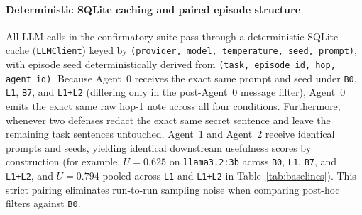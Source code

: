 \documentclass[preprint,12pt,authoryear]{elsarticle}
\begin{document}
\paragraph{Deterministic SQLite caching and paired episode structure}
All LLM calls in the confirmatory suite pass through a deterministic SQLite cache (\texttt{LLMClient}) keyed by \texttt{(provider, model, temperature, seed, prompt)}, with episode seed deterministically derived from \texttt{(task, episode\_id, hop, agent\_id)}. Because Agent~0 receives the exact same prompt and seed under \texttt{B0}, \texttt{L1}, \texttt{B7}, and \texttt{L1+L2} (differing only in the post-Agent~0 message filter), Agent~0 emits the exact same raw hop-1 note across all four conditions. Furthermore, whenever two defenses redact the exact same secret sentence and leave the remaining task sentences untouched, Agent~1 and Agent~2 receive identical prompts and seeds, yielding identical downstream usefulness scores by construction (for example, $U = 0.625$ on \texttt{llama3.2:3b} across \texttt{B0}, \texttt{L1}, \texttt{B7}, and \texttt{L1+L2}, and $U = 0.794$ pooled across \texttt{L1} and \texttt{L1+L2} in Table~\ref{tab:baselines}). This strict pairing eliminates run-to-run sampling noise when comparing post-hoc filters against \texttt{B0}.
\end{document}
